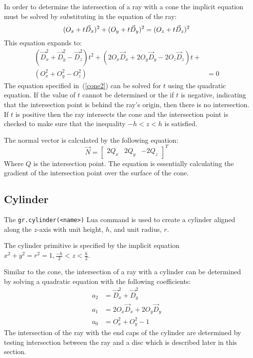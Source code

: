 In order to determine the intersection of a ray with a cone the implicit
equation must be solved by substituting in the equation of the ray:
\begin{equation}
  (O_{x} + t\vec{D}_{x})^2 + (O_{y} + t\vec{D}_{y})^2 = \\
  (O_{z} + t\vec{D}_{z})^2
\end{equation}
This equation expands to:
\begin{equation}
\begin{split}
  (\vec{D}_{x}^2 + \vec{D}_{y}^2 - \vec{D}_{z}^2)t^2 + (2O_{x}\vec{D}_{x} + 
  2O_{y}\vec{D}_{y} - 2O_{z}\vec{D}_{z})t + \\
  (O_{x}^2 + O_{y}^2 - O_{z}^2) &= 0\label{cone2}
\end{split}
\end{equation}
The equation specified in~(\ref{cone2}) can be solved for $t$ using the
quadratic equation. If the value of $t$ cannot be determined or the if $t$ is
negative, indicating that the intersection point is behind the ray's origin,
then there is no intersection. If $t$ is positive then the ray intersects the
cone and the intersection point is checked to make sure that the inequality $-h
< z < h$ is satisfied.

The normal vector is calculated by the following equation:
\begin{equation}
  \vec{N} = \begin{bmatrix} 2Q_{x} & 2Q_{y} & -2Q_{z}
  \end{bmatrix}^{T}
\end{equation}
Where $Q$ is the intersection point. The equation is essentially calculating the
gradient of the intersection point over the surface of the cone.

\subsection*{Cylinder}
The \verb|gr.cylinder(<name>)| Lua command is used to create a cylinder aligned
along the $z$-axis with unit height, $h$, and unit radius, $r$.

The cylinder primitive is specified by the implicit equation $x^2 + y^2 = r^2 =
1, \frac{-h}{2} < z < \frac{h}{2}$.

Similar to the cone, the intersection of a ray with a cylinder can be determined
by solving a quadratic equation with the following coefficients:
\begin{equation}
\begin{split}
  a_{2} &= \vec{D}_{x}^2 + \vec{D}_{y}^2 \\
  a_{1} &= 2O_{x}\vec{D}_{x} + 2O_{y}\vec{D}_{y} \\
  a_{0} &= O_{x}^2 + O_{y}^2 - 1
\end{split}
\end{equation}
The intersection of the ray with the end caps of the cylinder are determined by
testing intersection between the ray and a disc which is described later in this
section.

